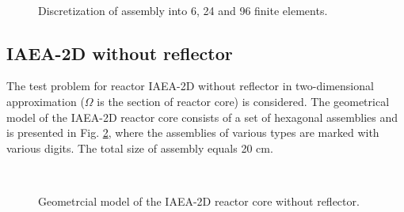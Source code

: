 \documentclass[authoryear]{elsarticle}
\begin{document}
\begin{figure}[h]
\begin{minipage}{0.30\linewidth}
	\end{minipage}
	\hfill
	\begin{minipage}{0.30\linewidth}
		\\
	\end{minipage}
	\caption{Discretization of assembly into 6, 24 and 96 finite elements.}
	\label{fig:mesh}
\end{figure}

\subsection{IAEA-2D without reflector}
The test problem for reactor IAEA-2D without reflector \citep{chao1995} in two-dimensional approximation ($\Omega$ is the section of reactor core) is considered.
The geometrical model of the IAEA-2D reactor core consists of a set of hexagonal assemblies and is presented in Fig. \ref{fig:iaea}, where the assemblies of various types are marked with various digits. 
The total size of assembly equals 20 cm. 

\begin{figure}[h]
	\\
	\caption{Geometrcial model of the IAEA-2D reactor core without reflector.}
	\label{fig:iaea}
\end{figure}
\end{document}
